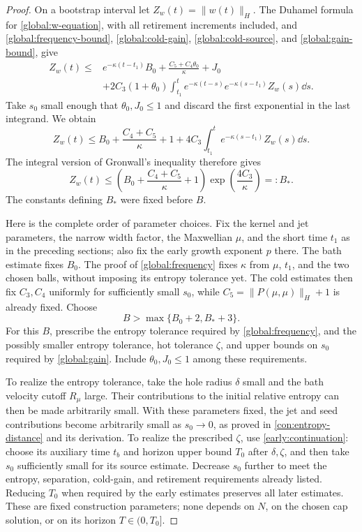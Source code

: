 \begin{proof}
On a bootstrap interval let $Z_w(t)=\|w(t)\|_H$.  The Duhamel formula
for \eqref{global:w-equation}, with all retirement increments included,
and \eqref{global:frequency-bound}, \eqref{global:cold-gain},
\eqref{global:cold-source}, and \eqref{global:gain-bound}, give
\begin{align*}
 Z_w(t)\le {}&e^{-\kappa(t-t_1)}B_0
  +\frac{C_5+C_4\theta_0}{\kappa}+J_0\\
 &+2C_3(1+\theta_0)
     \int_{t_1}^t e^{-\kappa(t-s)}e^{-\kappa(s-t_1)}Z_w(s)\dd s.
\end{align*}
Take $s_0$ small enough that $\theta_0,J_0\le1$ and discard the first
exponential in the last integrand.  We obtain
\begin{equation}\label{global:scalar-bootstrap}
 Z_w(t)\le B_0+\frac{C_4+C_5}{\kappa}+1
       +4C_3\int_{t_1}^t e^{-\kappa(s-t_1)}Z_w(s)\dd s.
\end{equation}
The integral version of Gronwall's inequality therefore gives
\begin{equation}\label{global:strict-improvement}
 Z_w(t)\le
 \left(B_0+\frac{C_4+C_5}{\kappa}+1\right)
       \exp\left(\frac{4C_3}{\kappa}\right)=:B_*.
\end{equation}
The constants defining $B_*$ were fixed before $B$.

Here is the complete order of parameter choices.  Fix the kernel and
jet parameters, the narrow width factor, the Maxwellian $\mu$, and the
short time $t_1$ as in the preceding sections; also fix the early
growth exponent $p$ there.  The bath estimate fixes $B_0$.
The proof of \cref{global:frequency} fixes $\kappa$ from $\mu$, $t_1$,
and the two chosen balls, without imposing its entropy tolerance yet.
The cold estimates then fix $C_3,C_4$ uniformly for sufficiently small
$s_0$, while $C_5=\|P(\mu,\mu)\|_H+1$ is already fixed.  Choose
\[
 B>\max\{B_0+2,B_*+3\}.
\]
For this $B$, prescribe the entropy tolerance required by
\cref{global:frequency}, and the possibly smaller entropy tolerance,
hot tolerance $\zeta$, and upper bounds on $s_0$ required by
\cref{global:gain}.  Include $\theta_0,J_0\le1$ among these requirements.

To realize the entropy tolerance, take the hole radius $\delta$ small
and the bath velocity cutoff $R_\mu$ large.  Their contributions to
the initial relative entropy can then be made arbitrarily small.
With these parameters fixed, the jet and seed contributions become
arbitrarily small as $s_0\to0$, as proved in
\eqref{con:entropy-distance} and its derivation.  To realize the
prescribed $\zeta$, use \cref{early:continuation}: choose its auxiliary
time $t_b$ and horizon upper bound $T_0$ after $\delta,\zeta$, and then
take $s_0$ sufficiently small for its source estimate.  Decrease $s_0$
further to meet the entropy, separation, cold-gain, and retirement
requirements already listed.  Reducing $T_0$ when required by the
early estimates preserves all later estimates.  These are fixed
construction parameters; none depends on $N$, on the chosen cap solution,
or on its horizon $T\in(0,T_0]$.


\end{proof}
